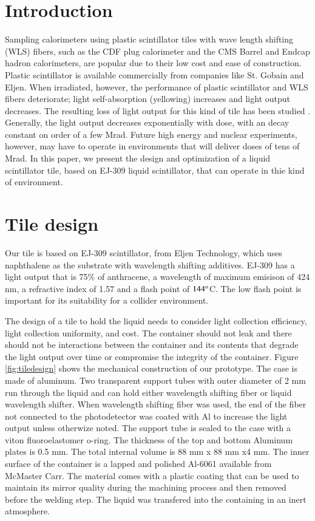 \documentclass[review]{elsarticle}
\begin{document}
\section{Introduction}
Sampling calorimeters using plastic scintillator tiles with wave length shifting (WLS) fibers, such as the CDF plug calorimeter \cite{Aota1995557}
and the CMS Barrel\cite{CMSHB} and Endcap\cite{HCALTDR1997} hadron calorimeters, are popular due to their low cost and ease of construction.  Plastic scintillator is available commercially from companies like St. Gobain and Eljen.  When irradiated, however, the performance of plastic scintillator and WLS fibers deteriorate; light self-absorption (yellowing) increases and light output decreases.  The resulting loss of light output for this kind of tile has been studied
\cite{vasken}\cite{ByonWagner1993263}.
Generally, the light output decreases exponentially with dose, with an decay constant on order of a few Mrad.  Future high energy and nuclear experiments, however, may have to operate in environments that will deliver doses of tens of Mrad.  In this paper, we present the design and optimization of a liquid scintillator tile, based on EJ-309 liquid scintillator, that can operate in thie kind of environment.


\section{Tile design}

Our tile is based on EJ-309 scintillator, from Eljen Technology, which uses naphthalene as the substrate with wavelength shifting additives.  EJ-309 has a light output that is 75\% of anthracene, a wavelength of maximum emisison of 424 nm, a refractive index of 1.57 and a flash point of $\rm{144^o}$C.  The low flash point is important for its suitability for a collider environment.

The design of a tile to hold the liquid needs to consider light collection efficiency, light collection uniformity, and cost.  The container should not leak and there should not be interactions between the container and its contents that degrade the light output over time or compromise the integrity
of the container.
Figure \ref{fig:tiledesign} shows the mechanical construction of our prototype.  The case is made of aluminum.  Two transparent support tubes with outer diameter of 2 mm run through the liquid and can hold either wavelength shifting fiber or liquid wavelength shifter.  When wavelength shifting fiber was used, the end of the fiber not connected to the photodetector was coated with Al to increase the light output unless otherwize noted.
The support tube is sealed to the case with a viton fluoroelastomer o-ring.  The thickness of the top and bottom Aluminum plates is 0.5 mm.  The total internal volume is 88 mm x 88 mm x4 mm. The inner surface of the container
is a lapped and polished Al-6061 available from McMaster Carr. The material comes with a plastic coating that can be 
used to maintain its mirror quality during the machining process and then removed before the welding step.  The liquid was transfered into the containing in an inert atmosphere.
\end{document}
